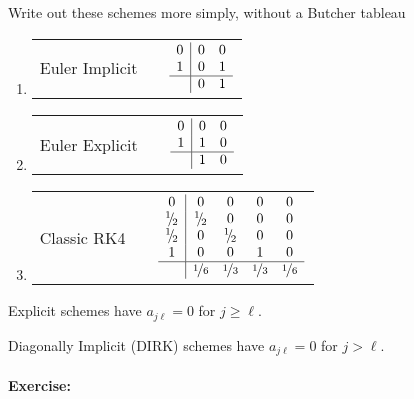 Write out these schemes more simply, without a Butcher tableau
\begin{enumerate}
\item %
\begin{tabular}{>{\raggedright}p{}>{\centering}p{}>{\raggedleft}p{}}
Euler Implicit &  & $\begin{array}{c|cc}
0 & 0 & 0\\
1 & 0 & 1\\
\hline  & 0 & 1
\end{array}$\tabularnewline
\end{tabular}
\item %
\begin{tabular}{>{\raggedright}p{}>{\centering}p{}>{\raggedleft}p{}}
Euler Explicit &  & $\begin{array}{c|cc}
0 & 0 & 0\\
1 & 1 & 0\\
\hline  & 1 & 0
\end{array}$\tabularnewline
\end{tabular}
\item %
\begin{tabular}{>{\raggedright}p{}>{\centering}p{}>{\raggedleft}p{}}
Classic RK4 &  & $\begin{array}{c|cccc}
0 & 0 & 0 & 0 & 0\\
\half & \half & 0 & 0 & 0\\
\half & 0 & \half & 0 & 0\\
1 & 0 & 0 & 1 & 0\\
\hline  & \nicefrac{1}{6} & \nicefrac{1}{3} & \nicefrac{1}{3} & \nicefrac{1}{6}
\end{array}$\tabularnewline
\end{tabular}
\end{enumerate}
\vfill{}
Explicit schemes have $a_{j\ell}=0$ for $j\ge\ell$.

Diagonally Implicit (DIRK) schemes have $a_{j\ell}=0$ for $j>\ell$.

\clearpage{}

\paragraph*{Exercise:}

